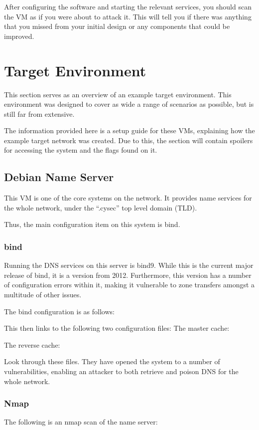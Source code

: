 			After configuring the software and starting the relevant services, you should scan the VM as if you were about to attack it.
			This will tell you if there was anything that you missed from your initial design or any components that could be improved.

	\section{Target Environment}
		This section serves as an overview of an example target environment.
		This environment was designed to cover as wide a range of scenarios as possible, but is still far from extensive\cite{CTFBlueprints}.

		The information provided here is a setup guide for these VMs, explaining how the example target network was created.
		Due to this, the section will contain spoilers for accessing the system and the flags found on it.
		\subsection{Debian Name Server}
			This VM is one of the core systems on the network.
			It provides name services for the whole network, under the ``.cysec'' top level domain (TLD).

			Thus, the main configuration item on this system is bind.
			\subsubsection{bind}
				Running the DNS services on this server is bind9.
				While this is the current major release of bind, it is a version from 2012.
				Furthermore, this version has a number of configuration errors within it, making it vulnerable to zone transfers amongst a multitude of other issues.

				The bind configuration is as follows:
				

				This then links to the following two configuration files:
				The master cache:
				
				The reverse cache:
				

				Look through these files.
				They have opened the system to a number of vulnerabilities, enabling an attacker to both retrieve and poison DNS for the whole network.

			\subsubsection{Nmap}
				The following is an nmap scan of the name server:
